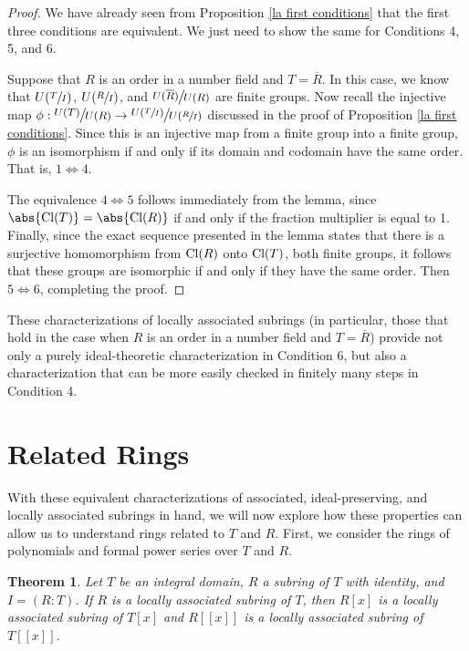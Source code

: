 \documentclass[12pt]{amsart}
\newtheorem{theorem}{Theorem}[section]
\theoremstyle{definition}
\newcommand{\Rbar}{\overline{R}}
\newcommand{\Cl}{\textup{Cl}}
\newcommand{\quot}[2]{\large\sfrac{#1}{#2}\normalsize}
\begin{document}
	\begin{proof}
		We have already seen from Proposition \ref{la first conditions} that the first three conditions are equivalent. We just need to show the same for Conditions 4, 5, and 6.
		
		Suppose that $R$ is an order in a number field and $T=\Rbar$. In this case, we know that $U(\sfrac{T}{I})$, $U(\sfrac{R}{I})$, and $\quot{U(\Rbar)}{U(R)}$ are finite groups. Now recall the injective map $\phi:\quot{U(T)}{U(R)}\to \quot{U(\sfrac{T}{I})}{U(\sfrac{R}{I})}$ discussed in the proof of Proposition \ref{la first conditions}. Since this is an injective map from a finite group into a finite group, $\phi$ is an isomorphism if and only if its domain and codomain have the same order. That is, $1\iff 4$. 
		
		The equivalence $4\iff 5$ follows immediately from the lemma, since $\abs{\Cl(T)}=\abs{\Cl(R)}$ if and only if the fraction multiplier is equal to 1. Finally, since the exact sequence presented in the lemma states that there is a surjective homomorphism from $\Cl(R)$ onto $\Cl(T)$, both finite groups, it follows that these groups are isomorphic if and only if they have the same order. Then $5\iff 6$, completing the proof.
	\end{proof}
	
	These characterizations of locally associated subrings (in particular, those that hold in the case when $R$ is an order in a number field and $T=\Rbar$) provide not only a purely ideal-theoretic characterization in Condition 6, but also a characterization that can be more easily checked in finitely many steps in Condition 4.
	
	\section{Related Rings}
	With these equivalent characterizations of associated, ideal-preserving, and locally associated subrings in hand, we will now explore how these properties can allow us to understand rings related to $T$ and $R$. First, we consider the rings of polynomials and formal power series over $T$ and $R$.
	
	\begin{theorem}
		\label{la ps and poly}
		Let $T$ be an integral domain, $R$ a subring of $T$ with identity, and $I=(R:T)$. If $R$ is a locally associated subring of $T$, then $R[x]$ is a locally associated subring of $T[x]$ and $R[[x]]$ is a locally associated subring of $T[[x]]$. 
	\end{theorem}
	
\end{document}
